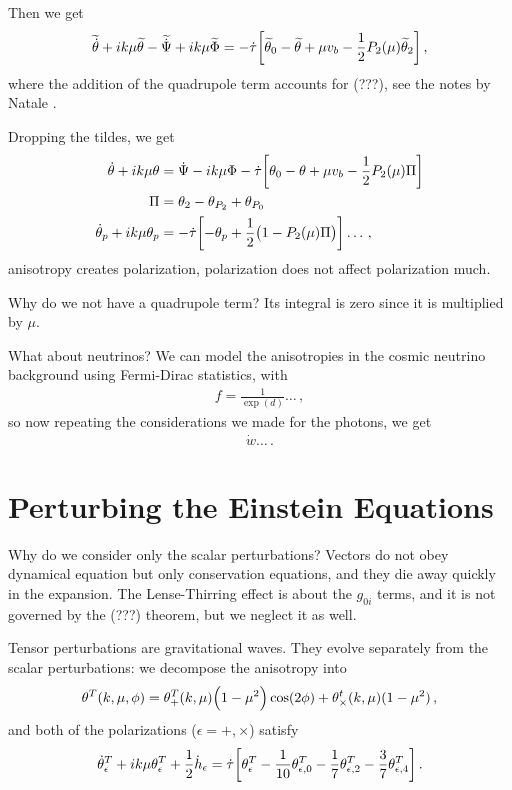 \documentclass[main.tex]{subfiles}
\begin{document}
Then we get 
%
\begin{align}
\widetilde{\dot{\theta}} + ik \mu \widetilde{\theta} - \widetilde{\dot{\Psi}}
+ ik \mu \widetilde{\Phi} =
-\dot{\tau} \qty[\widetilde{\theta}_{0} - \widetilde{\theta} 
+ \mu v_b - \frac{1}{2} P_2 (\mu ) \widetilde{\theta}_{2}] 
\,,
\end{align}
%
where the addition of the quadrupole term accounts for (???), see the notes by Natale \cite[]{nataleNoteCorsoDi2017}. 

Dropping the tildes, we get 
%
\begin{align}
\dot{\theta} + ik \mu \theta &= \dot{\Psi} - ik \mu \Phi - \dot{\tau} \qty[\theta_0 - \theta + \mu v_b - \frac{1}{2} P_2 (\mu ) \Pi ]  \\
\Pi &= \theta_2 - \theta_{P_2 } + \theta_{P_0 }  \\
\dot{\theta}_{p} + i k \mu \theta_{p} &= - \dot{\tau} \qty[- \theta_{p} + \frac{1}{2} \qty(1 - P_2 (\mu ) \Pi )] \dots
\,,
\end{align}
%
anisotropy creates polarization, polarization does not affect polarization much. 

Why do we not have a quadrupole term? Its integral is zero since it is multiplied by \(\mu \). 

What about neutrinos? 
We can model the anisotropies in the cosmic neutrino background using Fermi-Dirac statistics, with 
%
\begin{align}
f = \frac{1}{\exp(d)} \dots
\,,
\end{align}
%
so now repeating the considerations we made for the photons, we get 
%
\begin{align}
\dot{w} \dots
\,.
\end{align}

\section{Perturbing the Einstein Equations}

Why do we consider only the scalar perturbations? Vectors do not obey dynamical equation but only conservation equations, and they die away quickly in the expansion. 
The Lense-Thirring effect is about the \(g_{0i}\) terms, and it is not governed by the (???) theorem, but we neglect it as well. 

Tensor perturbations are gravitational waves. 
They evolve separately from the scalar perturbations: we decompose the anisotropy into 
%
\begin{align}
\theta^{T} (k, \mu, \phi ) = \theta^{T}_{+} (k, \mu ) \qty(1 - \mu^2) \cos( 2 \phi ) + \theta^{t}_{ \times } (k, \mu ) (1-\mu^2)
\,,
\end{align}
%
and both of the polarizations (\(\epsilon = +, \times \)) satisfy 
%
\begin{align}
\dot{\theta}^{T}_{\epsilon } + ik \mu \theta^{T}_{\epsilon } + \frac{1}{2} \dot{h}_{\epsilon } = \dot{\tau} \qty[
\theta^{T}_{\epsilon } - \frac{1}{10} \theta^{T}_{\epsilon, 0} - \frac{1}{7} \theta^{T}_{ \epsilon , 2} - \frac{3}{7} \theta^{T}_{\epsilon , 4}]
\,.
\end{align}
\end{document}
